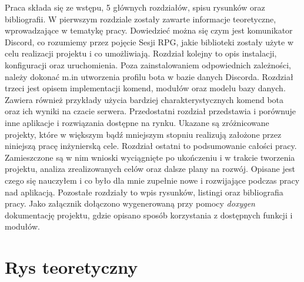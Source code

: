\documentclass[shortabstract,inz]{iithesis}
\begin{document}
		Praca składa się ze wstępu, 5 głównych rozdziałów, spisu rysunków oraz bibliografii. W pierwszym rozdziale zostały zawarte informacje teoretyczne, wprowadzające w tematykę pracy. Dowiedzieć można się czym jest komunikator Discord, co rozumiemy przez pojęcie Sesji RPG, jakie biblioteki zostały użyte w celu realizacji projektu i co umożliwiają. Rozdział kolejny to opis instalacji, konfiguracji oraz uruchomienia. Poza zainstalowaniem odpowiednich zależności, należy dokonać m.in utworzenia profilu bota w bazie danych Discorda. Rozdział trzeci jest opisem implementacji komend, modułów oraz modelu bazy danych. Zawiera również przykłady użycia bardziej charakterystycznych komend bota oraz ich wyniki na czacie serwera. Przedostatni rozdział przedstawia i porównuje inne aplikacje i rozwiązania dostępne na rynku. Ukazane są zróżnicowane projekty, które w większym bądź mniejszym stopniu realizują założone przez niniejszą pracę inżynierską cele. Rozdział ostatni to podsumowanie całości pracy. Zamieszczone są w nim wnioski wyciągnięte po ukończeniu i w trakcie tworzenia projektu, analiza zrealizowanych celów oraz dalsze plany na rozwój. Opisane jest czego się nauczyłem i co było dla mnie zupełnie nowe i rozwijające podczas pracy nad aplikacją. Pozostałe rozdziały to wpis rysunków, listingi oraz bibliografia pracy. Jako załącznik dołączono wygenerowaną przy pomocy \textit{doxygen}\cite{doxygen} dokumentację projektu, gdzie opisano sposób korzystania z dostępnych funkcji i modułów.
		
	\chapter{Rys teoretyczny}
\end{document}
